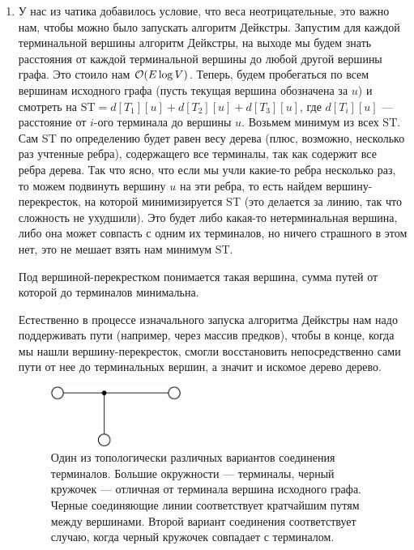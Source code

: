 \begin{solution}
    \begin{enumerate}
        \item У нас из чатика добавилось условие, что веса неотрицательные, это важно нам, чтобы можно было запускать алгоритм Дейкстры.
        Запустим для каждой терминальной вершины алгоритм Дейкстры, на выходе мы будем знать расстояния от каждой терминальной вершины до любой другой вершины графа. Это стоило нам $\mathcal{O}(E\log V)$.
        Теперь, будем пробегаться по всем вершинам исходного графа (пусть текущая вершина обозначена за $u$) и смотреть на $\text{ST} = d[T_1][u] + d[T_2][u] + d[T_3][u]$, где $d[T_i][u]$ --- расстояние от $i$-ого терминала до вершины $u$. Возьмем минимум из всех $\text{ST}$. Сам ST по определению будет равен весу дерева (плюс, возможно, несколько раз учтенные ребра), содержащего все терминалы, так как содержит все ребра дерева. Так что ясно, что если мы учли какие-то ребра несколько раз, то можем подвинуть вершину $u$ на эти ребра, то есть найдем вершину-перекресток, на которой минимизируется ST (это делается за линию, так что сложность не ухудшили). Это будет либо какая-то нетерминальная вершина, либо она может совпасть с одним их терминалов, но ничего страшного в этом нет, это не мешает взять нам минимум ST.

        \begin{remark}
            Под вершиной-перекрестком понимается такая вершина, сумма путей от которой до терминалов минимальна.
        \end{remark}

        Естественно в процессе изначального запуска алгоритма Дейкстры нам надо поддерживать пути (например, через массив предков), чтобы в конце, когда мы нашли вершину-перекресток, смогли восстановить непосредственно сами пути от нее до терминальных вершин, а значит и искомое дерево дерево.

        \newpage
        \begin{upd}
            \begin{figure}[H]
                \centering
                \includegraphics[width=0.4\textwidth]{pics/1a.eps}
                \caption{Один из топологически различных вариантов соединения терминалов. Большие окружности --- терминалы, черный кружочек --- отличная от терминала вершина исходного графа. Черные соединяющие линии соответствует кратчайшим путям между вершинами. Второй вариант соединения соответствует случаю, когда черный кружочек совпадает с терминалом.}
                \label{fig:1a}
            \end{figure}


\end{upd}
\end{enumerate}
\end{solution}
